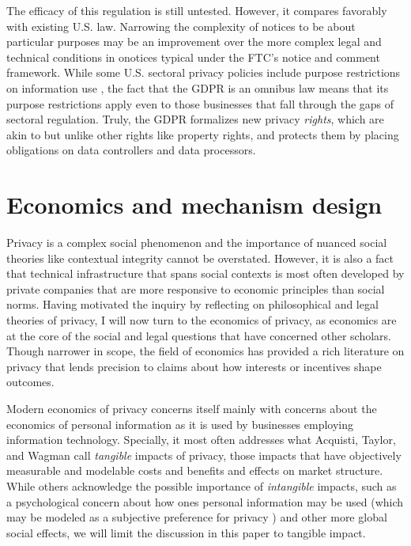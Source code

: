 \documentclass[../thesis.tex]{subfiles}
\begin{document}
The efficacy of this regulation is still untested.
However, it compares favorably with existing U.S. law.
Narrowing the complexity of notices to be about particular
purposes may be an improvement over the
more complex legal and technical conditions in onotices
typical under the FTC's notice and comment framework.
While some U.S. sectoral privacy policies include
purpose restrictions on information use
\cite{tschantz2012formalizing}, the fact that
the GDPR is an omnibus law means that its purpose
restrictions apply even to those businesses that
fall through the gaps of sectoral regulation.
Truly, the GDPR formalizes new privacy \emph{rights},
which are akin to but unlike other rights like
property rights, and protects them by placing
obligations on data controllers and data processors.


\section{Economics and mechanism design}
\label{sec:economics}

Privacy is a complex social phenomenon and the
importance of nuanced social theories like
contextual integrity cannot be overstated.
However, it is also a fact that technical
infrastructure that spans social contexts
is most often developed by private companies that are more
responsive to economic principles than social norms.
Having motivated the inquiry by reflecting on
philosophical and legal theories of privacy,
I will now turn to the economics of privacy,
as economics are at the core of the social and
legal questions that have concerned other scholars.
Though narrower in scope, the field of economics
has provided a rich
literature on privacy that lends precision to
claims about how interests
or incentives shape outcomes.

Modern economics of privacy concerns itself mainly with
concerns about the economics of personal information
as it is used by businesses employing
information technology.
Specially, it most often addresses what Acquisti,
 Taylor, and Wagman \cite{acquisti2016economics} 
call \emph{tangible} impacts of privacy, those impacts that
have objectively measurable and modelable costs and
benefits and effects on market structure.
While others acknowledge the possible importance
of \emph{intangible} impacts, such as a psychological
concern about how ones personal information may be
used (which may be modeled as a subjective preference
for privacy \cite{calo2011boundaries} 
\cite{cofone2017dynamic}) and other more global
social effects, we will limit the discussion in this
paper to tangible impact.
\end{document}
